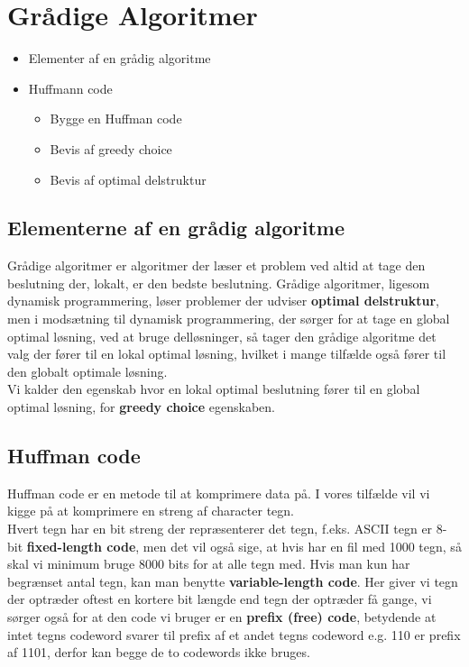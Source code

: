 \section{Grådige Algoritmer}
\hrulefill

\begin{itemize}
\item Elementer af en grådig algoritme
\item Huffmann code
  \begin{itemize}
  \item Bygge en Huffman code
  \item Bevis af greedy choice
  \item Bevis af optimal delstruktur
  \end{itemize}
\end{itemize}

\newpage
\subsection{Elementerne af en grådig algoritme}
Grådige algoritmer er algoritmer der læser et problem ved altid at tage den beslutning der, lokalt, er den bedste beslutning. Grådige algoritmer, ligesom dynamisk programmering, løser problemer der udviser \textbf{optimal delstruktur}, men i modsætning til dynamisk programmering, der sørger for at tage en global optimal løsning, ved at bruge delløsninger, så tager den grådige algoritme det valg der fører til en lokal optimal løsning, hvilket i mange tilfælde også fører til den globalt optimale løsning.\\
Vi kalder den egenskab hvor en lokal optimal beslutning fører til en global optimal løsning, for \textbf{greedy choice} egenskaben.\\

\subsection{Huffman code}
Huffman code er en metode til at komprimere data på. I vores tilfælde vil vi kigge på at komprimere en streng af character tegn.\\
Hvert tegn har en bit streng der repræsenterer det tegn, f.eks. ASCII tegn er 8-bit \textbf{fixed-length code}, men det vil også sige, at hvis har en fil med 1000 tegn, så skal vi minimum bruge 8000 bits for at alle tegn med. Hvis man kun har begrænset antal tegn, kan man benytte \textbf{variable-length code}. Her giver vi tegn der optræder oftest en kortere bit længde end tegn der optræder få gange, vi sørger også for at den code vi bruger er en \textbf{prefix (free) code}, betydende at intet tegns codeword svarer til prefix af et andet tegns codeword e.g. 110 er prefix af 1101, derfor kan begge de to codewords ikke bruges.\\

